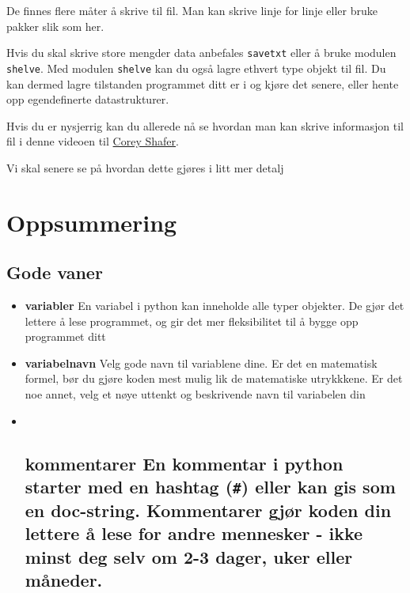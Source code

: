 \documentclass[11pt]{article}
\begin{document}
De finnes flere måter å skrive til fil. Man kan skrive linje for linje
eller bruke pakker slik som her.

Hvis du skal skrive store mengder data anbefales \texttt{savetxt} eller
å bruke modulen \texttt{shelve}. Med modulen \texttt{shelve} kan du også
lagre ethvert type objekt til fil. Du kan dermed lagre tilstanden
programmet ditt er i og kjøre det senere, eller hente opp egendefinerte
datastrukturer.

Hvis du er nysjerrig kan du allerede nå se hvordan man kan skrive
informasjon til fil i denne videoen til
\href{https://www.youtube.com/watch?v=Uh2ebFW8OYM}{Corey Shafer}.

Vi skal senere se på hvordan dette gjøres i litt mer detalj

    \hypertarget{oppsummering}{%
\section{Oppsummering}\label{oppsummering}}

\hypertarget{gode-vaner}{%
\subsection{Gode vaner}\label{gode-vaner}}

\begin{itemize}
\item
  \textbf{variabler} En variabel i python kan inneholde alle typer
  objekter. De gjør det lettere å lese programmet, og gir det mer
  fleksibilitet til å bygge opp programmet ditt
\item
  \textbf{variabelnavn} Velg gode navn til variablene dine. Er det en
  matematisk formel, bør du gjøre koden mest mulig lik de matematiske
  utrykkkene. Er det noe annet, velg et nøye uttenkt og beskrivende navn
  til variabelen din
\item ~
  \hypertarget{kommentarer-en-kommentar-i-python-starter-med-en-hashtag-eller-kan-gis-som-en-doc-string.-kommentarer-gjuxf8r-koden-din-lettere-uxe5-lese-for-andre-mennesker---ikke-minst-deg-selv-om-2-3-dager-uker-eller-muxe5neder.}{%
  \subsection{\texorpdfstring{\textbf{kommentarer} En kommentar i python
  starter med en hashtag (\texttt{\#}) eller kan gis som en doc-string.
  Kommentarer gjør koden din lettere å lese for andre mennesker - ikke
  minst deg selv om 2-3 dager, uker eller
  måneder.}{kommentarer En kommentar i python starter med en hashtag (\#) eller kan gis som en doc-string. Kommentarer gjør koden din lettere å lese for andre mennesker - ikke minst deg selv om 2-3 dager, uker eller måneder.}}\label{kommentarer-en-kommentar-i-python-starter-med-en-hashtag-eller-kan-gis-som-en-doc-string.-kommentarer-gjuxf8r-koden-din-lettere-uxe5-lese-for-andre-mennesker---ikke-minst-deg-selv-om-2-3-dager-uker-eller-muxe5neder.}}
\end{itemize}
\end{document}
